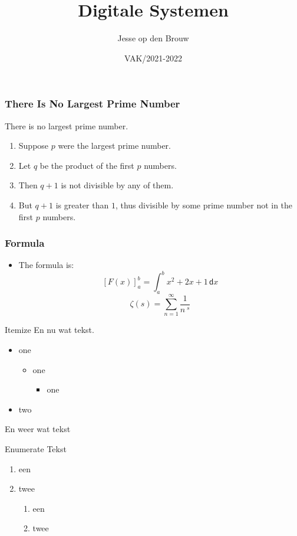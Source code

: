 \documentclass[fleqn,aspectratio=43]{beamer}
\title{Digitale Systemen}
\author{Jesse op den Brouw}
\date{VAK/2021-2022}
\begin{document}
\begin{frame}
\titlepage
\end{frame}

\begin{frame} 
\frametitle{There Is No Largest Prime Number} 
\begin{theorem}
There is no largest prime number. \end{theorem} 
\begin{enumerate} 
\item<1-| alert@1> Suppose $p$ were the largest prime number. 
\item<2-| alert@2> Let $q$ be the product of the first $p$ numbers. 
\item<3-| alert@3> Then $q+1$ is not divisible by any of them. 
\item<1-> But $q + 1$ is greater than $1$, thus divisible by some prime
number not in the first $p$ numbers.
\end{enumerate}
\end{frame}

\begin{frame}
\frametitle{Formula}
\begin{itemize}
\item The formula is:
\begin{equation*}
\left[F(x)\right]^b_a = \int_a^b x^2 + 2x + 1 \, \mathsf{d} x
\end{equation*}
\begin{equation*}
\zeta (s) = \sum_{n=1}^\infty \dfrac{1}{n^{\;\!s}}
\end{equation*}
\end{itemize}
\end{frame}

\begin{frame}{Itemize}
En nu wat tekst.
\begin{itemize}
\item one
\begin{itemize}
\item one
\begin{itemize}
\item one
\end{itemize}
\end{itemize}
\item two
\end{itemize}
En weer wat tekst
\end{frame}


\begin{frame}{Enumerate}
Tekst
\begin{enumerate}
\item een
\item twee
\begin{enumerate}
\item een
\item twee
\end{enumerate}
\end{enumerate}
\end{frame}
\end{document}

